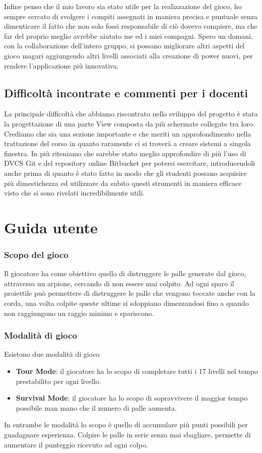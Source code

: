 \documentclass[a4paper,12pt]{report}
\begin{document}
Infine penso che il mio lavoro sia stato utile per la realizzazione del gioco, ho sempre cercato di svolgere i compiti assegnati in maniera precisa e puntuale senza dimenticare il fatto che non solo fossi responsabile di ciò dovevo compiere, ma che far del proprio meglio avrebbe aiutato me ed i miei compagni.
Spero un domani, con la collaborazione dell'intero gruppo, si possano migliorare altri aspetti del gioco magari aggiungendo altri livelli associati alla creazione di power nuovi, per rendere l'applicazione più innovativa.

\section{Difficoltà incontrate e commenti per i docenti}
La principale difficoltà che abbiamo riscontrato nello sviluppo del progetto è stata la progettazione di una parte View composta da più schermate collegate tra loro. Crediamo che sia una sezione importante e che meriti un approfondimento nella trattazione del corso in quanto raramente ci si troverà a creare sistemi a singola finestra. 
In più riteniamo che sarebbe stato meglio approfondire di più l'uso di DVCS Git e del repository online Bitbucket per potersi esercitare, introducendoli anche prima di quanto è stato fatto in modo che gli studenti possano acquisire più dimestichezza ed utilizzare da subito questi strumenti in maniera efficace visto che si sono rivelati incredibilmente utili.


\appendix
\chapter{Guida utente}

\subsection*{Scopo del gioco}
Il giocatore ha come obiettivo quello di distruggere le palle generate dal gioco, attraverso un arpione,  cercando di non essere mai colpito. 
Ad ogni sparo il proiettile può permettere di distruggere le palle che vengono toccate anche con la corda, una volta colpite queste ultime si sdoppiano dimezzandosi fino a quando non raggiungono un raggio minimo e spariscono.

\subsection*{Modalità di gioco}
Esistono due modalità di gioco
\begin{itemize}
	\item \textbf{Tour Mode}: il giocatore ha lo scopo di completare tutti i 17 livelli nel tempo prestabilito per ogni livello.
	\item \textbf{Survival Mode}: il giocatore ha lo scopo di sopravvivere il maggior tempo possibile man mano che il numero di palle aumenta.
\end{itemize}
In entrambe le modalità lo scopo è quello di accumulare più punti possibili per guadagnare esperienza.
Colpire le palle in serie senza mai sbagliare, permette di aumentare il punteggio ricevuto ad ogni colpo.
\end{document}
